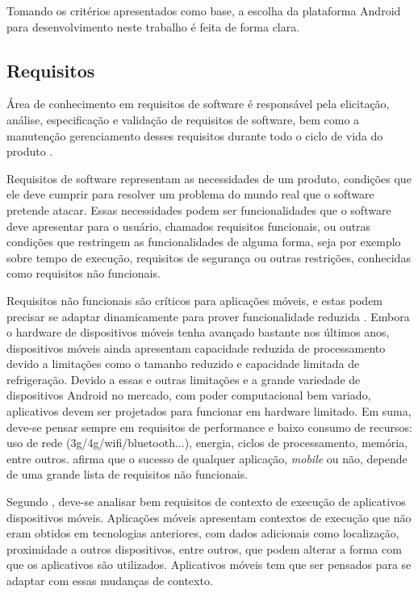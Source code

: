 Tomando os critérios apresentados como base, a escolha da plataforma Android para desenvolvimento neste trabalho é feita de forma clara.

\subsection{Requisitos}

Área de conhecimento em requisitos de software é responsável pela elicitação, análise, especificação e validação de requisitos de software, bem como a manutenção gerenciamento desses requisitos durante todo o ciclo de vida do produto \cite{swebok}.

Requisitos de software representam as necessidades de um produto, condições que ele deve cumprir para resolver um problema do mundo real que o software pretende atacar. Essas necessidades podem ser funcionalidades que o software deve apresentar para o usuário, chamados requisitos funcionais, ou outras condições que restringem as funcionalidades de alguma forma, seja por exemplo sobre tempo de execução, requisitos de segurança ou outras restrições, conhecidas como requisitos não funcionais.

Requisitos não funcionais são críticos para aplicações móveis, e estas podem precisar se adaptar dinamicamente para prover funcionalidade reduzida \cite{eswmobile}. Embora o hardware de dispositivos móveis tenha avançado bastante nos últimos anos, dispositivos móveis ainda apresentam capacidade reduzida de processamento devido a limitações como o tamanho reduzido e capacidade limitada de refrigeração. Devido a essas e outras limitações e a grande variedade de dispositivos Android no mercado, com poder computacional bem variado, aplicativos devem ser projetados para funcionar em hardware limitado. Em suma, deve-se pensar sempre em requisitos de performance e baixo consumo de recursos: uso de rede (3g/4g/wifi/bluetooth...), energia, ciclos de processamento, memória, entre outros.  afirma que o sucesso de qualquer aplicação, \textit{mobile} ou não, depende de uma grande lista de requisitos não funcionais.  

Segundo , deve-se analisar bem requisitos de contexto de execução de aplicativos dispositivos móveis. Aplicações móveis apresentam contextos de execução que não eram obtidos em tecnologias anteriores, com dados adicionais como localização, proximidade a outros dispositivos, entre outros, que podem alterar a forma com que os aplicativos são utilizados. Aplicativos móveis tem que ser pensados para se adaptar com essas mudanças de contexto.

